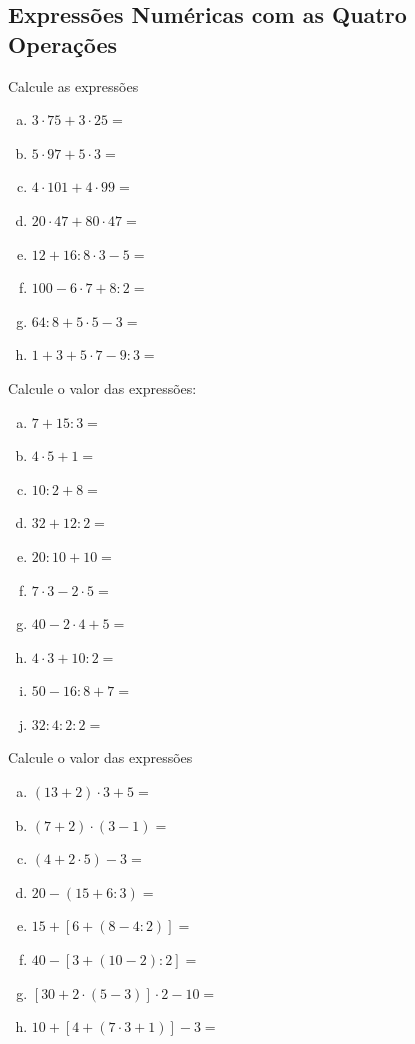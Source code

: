 \subsection{Expressões Numéricas com as Quatro Operações}

\item Calcule as expressões
\begin{multicols}{2}
\begin{enumerate}[a)]
	\item $3\cdot 75+3\cdot 25 =$
	\item $5\cdot 97+5\cdot 3 =$
	\item $4\cdot 101+4\cdot 99 =$
	\item $ 20\cdot 47+80\cdot 47 =$
	\item $12+16:8\cdot 3-5 =$
	\item $ 100-6\cdot 7+8:2 =$
	\item $64:8+5\cdot 5-3 =$
	\item $1+3+5\cdot 7-9:3 =$
\end{enumerate}
\end{multicols}

\item Calcule o valor das expressões:
\begin{multicols}{2}
\begin{enumerate}[a)]
	\item $ 7+15:3 =$
	\item $4\cdot 5+1 =$
	\item $10:2+8 = $
	\item $32+12:2 =$
	\item $20:10+10 =$
	\item $7\cdot 3-2\cdot 5 =$
	\item $40-2\cdot 4+5 =$
	\item $4\cdot 3+10:2 =$
	\item $50-16:8+7 =$
	\item $32:4:2:2 =$
\end{enumerate}
\end{multicols}

\item Calcule o valor das expressões
\begin{multicols}{2}
\begin{enumerate}[a)]
	\item $(13+2)\cdot 3+5 =$
	\item $(7+2)\cdot (3-1) =$
	\item $(4+2\cdot 5)-3 =$
	\item $ 20-(15+6:3) =$
	\item $15+[6+(8-4:2)] =$
	\item $40-[3+(10-2):2] =$
	\item $[30+2\cdot (5-3)]\cdot 2-10 =$
	\item $10+[4+(7\cdot 3+1)]-3 =$
\end{enumerate}
\end{multicols}


